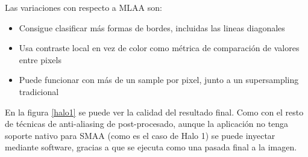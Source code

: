 \documentclass[withindex, glossary]{cam-thesis}
\begin{document}
Las variaciones con respecto a MLAA son:

\begin{itemize}
    \item Consigue clasificar más formas de bordes, incluidas las lineas diagonales
    \item Usa contraste local en vez de color como métrica de comparación de valores entre pixels
    \item Puede funcionar con más de un sample por pixel, junto a un supersampling tradicional
\end{itemize}

En la figura \ref{halo1} se puede ver la calidad del resultado final. Como con el resto de técnicas de anti-aliasing de post-procesado, aunque la aplicación no tenga soporte nativo para SMAA (como es el caso de Halo 1) se puede inyectar mediante software, gracias a que se ejecuta como una pasada final a la imagen.
\end{document}
